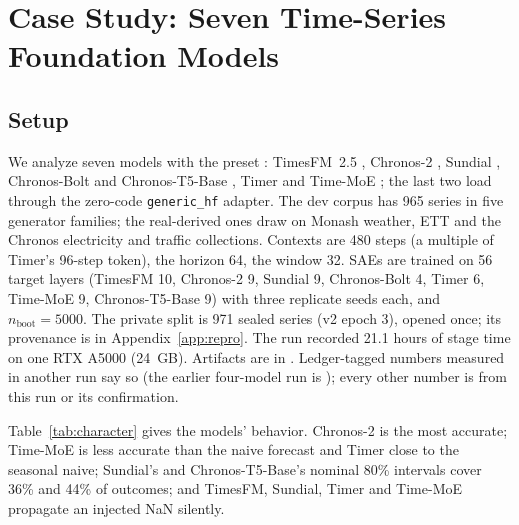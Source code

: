 \section{Case Study: Seven Time-Series Foundation Models}
\label{sec:casestudy}

\subsection{Setup}
\label{sec:setup}

We analyze seven models with the preset : TimesFM~2.5 \citep{das2024timesfm},
Chronos-2 \citep{ansari2025chronos2}, Sundial \citep{liu2025sundial}, Chronos-Bolt and Chronos-T5-Base
\citep{ansari2024chronos}, Timer \citep{liu2024timer} and Time-MoE \citep{shi2025timemoe}; the last two load through the
zero-code \texttt{generic\_hf} adapter. The dev corpus has 965 series in five generator families; the real-derived ones
draw on Monash weather, ETT \citep{zhou2021informer} and the Chronos electricity and traffic collections. Contexts are
480 steps (a multiple of Timer's 96-step token), the horizon 64, the window 32. SAEs are trained on 56 target layers
(TimesFM 10, Chronos-2 9, Sundial 9, Chronos-Bolt 4, Timer 6, Time-MoE 9, Chronos-T5-Base 9) with three replicate seeds
each, and $n_{\text{boot}}=5000$. The private split is 971 sealed series (v2 epoch 3), opened once; its provenance is in
Appendix~\ref{app:repro}. The run recorded 21.1 hours of stage time on one RTX A5000 (24~GB). Artifacts are in
. Ledger-tagged numbers measured in another run say so (the earlier four-model run is
); every other number is from this run or its confirmation.

Table~\ref{tab:character} gives the models' behavior. Chronos-2 is the most accurate; Time-MoE is less accurate than the
naive forecast and Timer close to the seasonal naive; Sundial's and Chronos-T5-Base's nominal 80\% intervals cover 36\%
and 44\% of outcomes; and TimesFM, Sundial, Timer and Time-MoE propagate an injected NaN silently.

